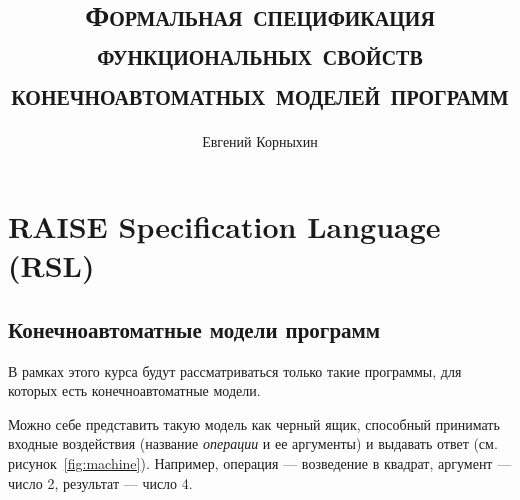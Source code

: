 \documentclass[14pt, twoside]{extreport}
\author{Евгений Корныхин}
\title{\huge{\textbf{\textsc{Формальная спецификация функциональных свойств конечноавтоматных моделей программ}}}}
\begin{document}
\maketitle

\tableofcontents \pagebreak





\chapter{RAISE Specification Language (RSL)}

\section{Конечноавтоматные модели программ}

В рамках этого курса будут рассматриваться только такие программы, для которых есть конечноавтоматные модели.

Можно себе представить такую модель как черный ящик, способный принимать входные воздействия (название \emph{операции} и ее аргументы) и выдавать ответ (см. рисунок~\ref{fig:machine}). Например, операция --- возведение в квадрат, аргумент --- число 2, результат --- число 4. 
\end{document}
